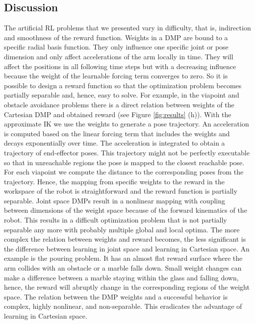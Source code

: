 \documentclass{svproc}
\begin{document}
\subsection{Discussion}
The artificial RL problems that we presented vary in
difficulty, that is, indirection and smoothness of the reward function.
Weights in a DMP are bound to a specific radial basis function.
They only influence one specific joint or pose dimension and only
affect accelerations of the arm locally in time.
They will affect the positions in all following
time steps but with a decreasing influence because the weight of the
learnable forcing term converges to zero.
So it is possible to design a reward function so that the optimization
problem becomes partially separable and, hence, easy to solve.
For example, in the viapoint and obstacle avoidance problems there is a direct
relation between weights of the Cartesian DMP and obtained reward (see Figure
\ref{fig:results} (h)).
With the approximate IK we use the weights to generate a pose trajectory.
An acceleration is computed based on the linear forcing term that includes
the weights and decays exponentially over time.
The acceleration is integrated to obtain a trajectory of
end-effector poses. This trajectory might not be perfectly executable so that
in unreachable regions the pose is mapped to the closest reachable pose.
For each viapoint we compute the distance to the corresponding poses
from the trajectory.
Hence, the mapping from specific weights to the reward in the workspace of
the robot is straightforward and the reward function is partially separable.
Joint space DMPs result in a nonlinear mapping with coupling between dimensions
of the weight space because of the forward kinematics of the robot.
This results in a difficult optimization problem that is not partially
separable any more with probably multiple global and local optima.
The more complex the relation between weights and reward becomes, the
less significant is the difference between learning in joint space and
learning in Cartesian space.
An example is the pouring problem. It has an almost flat reward
surface where the arm collides with an obstacle or a marble falls down.
Small weight changes can make a difference between a
marble staying within the glass and falling down, hence, the reward will
abruptly change in the corresponding regions of the weight space.
The relation between the DMP weights and a successful behavior is
complex, highly nonlinear, and non-separable. This eradicates the
advantage of learning in Cartesian space.
\end{document}
